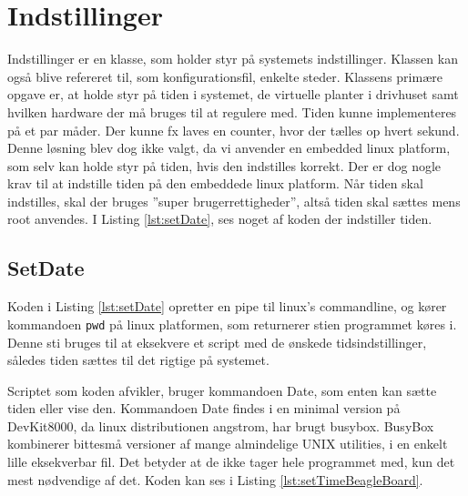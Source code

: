 \section{Indstillinger} \label{sec:Indstillinger_impl}

Indstillinger er en klasse, som holder styr på systemets indstillinger. Klassen kan også blive refereret til, som konfigurationsfil, enkelte steder. Klassens primære opgave er, at holde styr på tiden i systemet, de virtuelle planter i drivhuset samt hvilken hardware der må bruges til at regulere med.
Tiden kunne implementeres på et par måder. Der kunne fx laves en counter, hvor der tælles op hvert sekund. Denne løsning blev dog ikke valgt, da vi anvender en embedded linux platform, som selv kan holde styr på tiden, hvis den indstilles korrekt. Der er dog nogle krav til at indstille tiden på den embeddede linux platform. Når tiden skal indstilles, skal der bruges ”super brugerrettigheder”, altså tiden skal sættes mens root anvendes.
I Listing \ref{lst:setDate}, ses noget af koden der indstiller tiden.

\subsection{SetDate}

Koden i Listing \ref{lst:setDate} opretter en pipe til linux’s commandline, og kører kommandoen \texttt{pwd} på linux platformen, som returnerer stien programmet køres i. Denne sti bruges til at eksekvere et script med de ønskede tidsindstillinger, således tiden sættes til det rigtige på systemet. 



Scriptet som koden afvikler, bruger kommandoen Date, som enten kan sætte tiden eller vise den. Kommandoen Date findes i en minimal version på DevKit8000, da linux distributionen angstrom, har brugt busybox. BusyBox kombinerer bittesmå versioner af mange almindelige UNIX utilities, i en enkelt lille eksekverbar fil. Det betyder at de ikke tager hele programmet med, kun det mest nødvendige af det.  Koden kan ses i Listing \ref{lst:setTimeBeagleBoard}.

\clearpage



